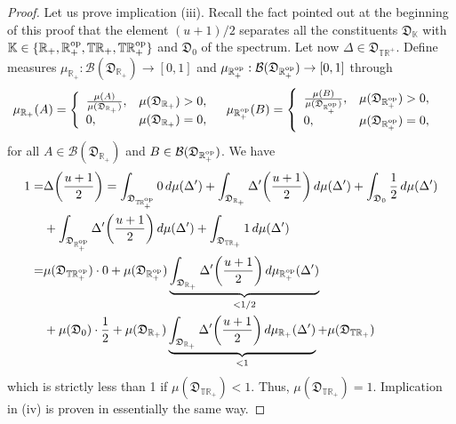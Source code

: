\documentclass[12pt,a4paper,reqno]{amsart}
\theoremstyle{definition}
\newcommand{\mc}[1]{\mathcal{#1}}
\newcommand{\mf}[1]{\mathfrak{#1}}
\newcommand{\mb}[1]{\mathbb{#1}}
\newcommand{\R}{\mathbb R}
\newcommand{\T}{\mathbb T}
\let\originalleft\left
\let\originalright\right
\renewcommand{\left}{\mathopen{}\mathclose\bgroup\originalleft}
\renewcommand{\right}{\aftergroup\egroup\originalright}
\begin{document}
\begin{proof}
Let us prove implication (iii). Recall the fact pointed out at the beginning of this proof that the element $(u+1)/2$ separates all the constituents $\mf D_{\mb K}$ with $\mb K\in\{\R_+,\R_+^{\rm op},\T\R_+,\T\R_+^{\rm op}\}$ and $\mf D_0$ of the spectrum. Let now $\Delta\in\mf D_{\T\R^+}$. Define measures $\mu_{\R_+}:\mc B(\mf D_{\R_+})\to[0,1]$ and $\mu_{\R_+^{\rm op}}:\mc B(\mf D_{\R_+^{\rm op}})\to[0,1]$ through
\begin{align*}
\mu_{\R_+}(A)&=\left\{\begin{array}{ll}
\frac{\mu(A)}{\mu(\mf D_{\R_+})},&\mu(\mf D_{\R_+})>0,\\
0,&\mu(\mf D_{\R_+})=0,
\end{array}\right.\quad\mu_{\R_+^{\rm op}}(B)=\left\{\begin{array}{ll}
\frac{\mu(B)}{\mu(\mf D_{\R_+^{\rm op}})},&\mu(\mf D_{\R_+^{\rm op}})>0,\\
0,&\mu(\mf D_{\R_+^{\rm op}})=0,
\end{array}\right.
\end{align*}
for all $A\in\mc B(\mf D_{\R_+})$ and $B\in\mc B(\mf D_{\R_+^{\rm op}})$. We have
\begin{align*}
1=&\Delta\left(\frac{u+1}{2}\right)=\int_{\mf D_{\T\R_+^{\rm op}}}0\,d\mu(\Delta')+\int_{\mf D_{\R_+}}\Delta'\left(\frac{u+1}{2}\right)\,d\mu(\Delta')+\int_{\mf D_0}\frac{1}{2}\,d\mu(\Delta')\\
&+\int_{\mf D_{\R_+^{\rm op}}}\Delta'\left(\frac{u+1}{2}\right)\,d\mu(\Delta')+\int_{\mf D_{\T\R_+}}1\,d\mu(\Delta')\\
=&\mu(\mf D_{\T\R_+^{\rm op}})\cdot 0+\mu(\mf D_{\R_+^{\rm op}})\underbrace{\int_{\mf D_{\R_+}}\Delta'\left(\frac{u+1}{2}\right)\,d\mu_{\R_+^{\rm op}}(\Delta')}_{<1/2}\\
&+\mu(\mf D_0)\cdot\frac{1}{2}+\mu(\mf D_{\R_+})\underbrace{\int_{\mf D_{\R_+}}\Delta'\left(\frac{u+1}{2}\right)\,d\mu_{\R_+}(\Delta')}_{<1}+\mu(\mf D_{\T\R_+})
\end{align*}
which is strictly less than 1 if $\mu(\mf D_{\T\R_+})<1$. Thus, $\mu(\mf D_{\T\R_+})=1$. Implication in (iv) is proven in essentially the same way.


\end{proof}
\end{document}
